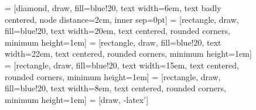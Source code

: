 \documentclass[%
 aip,
 jcp,
 sd,%
 amsmath,amssymb,
 reprint,%
]{revtex4-1}
\begin{document}
\begin{figure}[!h]
\centering
{} = [diamond, draw, fill=blue!20, text width=6em, text badly centered, node distance=2cm, inner sep=0pt]
 = [rectangle, draw, fill=blue!20, text width=20em, text centered, rounded corners, minimum height=1em]
 = [rectangle, draw, fill=blue!20, text width=22em, text centered, rounded corners, minimum height=1em]
 = [rectangle, draw, fill=blue!20, text width=15em, text centered, rounded corners, minimum height=1em]
 = [rectangle, draw, fill=blue!20, text width=8em, text centered, rounded corners, minimum height=1em]
 = [draw, -latex']

\end{figure}
\end{document}
